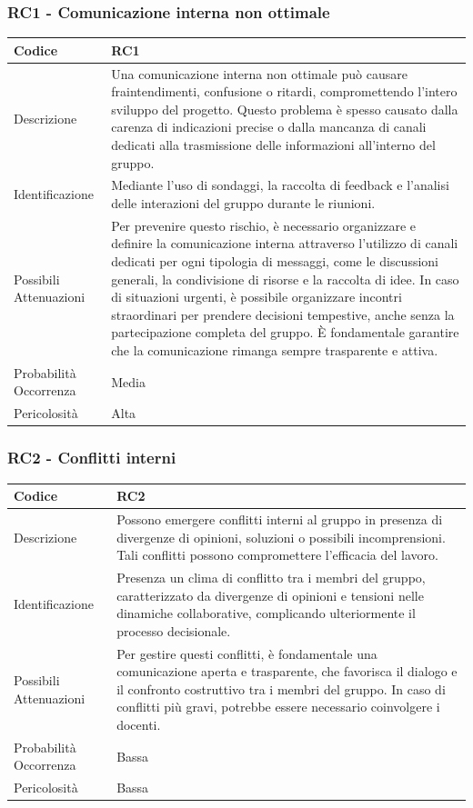 \documentclass[10pt]{article}
\begin{document}
{    \subsubsection{RC1 - Comunicazione interna non ottimale}
    \label{RC1}
    \begin{tabularx}{\textwidth}{|l|X|}
    \hline
    Codice & RC1 \\
    \hline
    Descrizione & Una comunicazione interna non ottimale può causare fraintendimenti, confusione o ritardi, compromettendo l’intero sviluppo del progetto. Questo problema è spesso causato dalla carenza di indicazioni precise o dalla mancanza di canali dedicati alla trasmissione delle informazioni all’interno del gruppo. \\
    \hline
    Identificazione & Mediante l'uso di sondaggi, la raccolta di feedback e l'analisi delle interazioni del gruppo durante le riunioni.   \\
    \hline
    Possibili Attenuazioni & Per prevenire questo rischio, è necessario organizzare e definire la comunicazione interna attraverso l’utilizzo di canali dedicati per ogni tipologia di messaggi, come le discussioni generali, la condivisione di risorse e la raccolta di idee. In caso di situazioni urgenti, è possibile organizzare incontri straordinari per prendere decisioni tempestive, anche senza la partecipazione completa del gruppo. È fondamentale garantire che la comunicazione rimanga sempre trasparente e attiva. \\
    \hline
    Probabilità Occorrenza &  Media \\
    \hline
    Pericolosità & Alta \\ 
    \hline
    \end{tabularx}
    
    \subsubsection{RC2 - Conflitti interni}
    \label{RC2}
    \begin{tabularx}{\textwidth}{|l|X|}
    \hline
    Codice & RC2 \\
    \hline
    Descrizione & Possono emergere conflitti interni al gruppo in presenza di divergenze di opinioni, soluzioni o possibili incomprensioni. Tali conflitti possono compromettere l'efficacia del lavoro. \\
    \hline
    Identificazione & Presenza un clima di conflitto tra i membri del gruppo, caratterizzato da divergenze di opinioni e tensioni nelle dinamiche collaborative, complicando ulteriormente il processo decisionale.   \\
    \hline
    Possibili Attenuazioni &  Per gestire questi conflitti, è fondamentale una comunicazione aperta e trasparente, che favorisca il dialogo e il confronto costruttivo tra i membri del gruppo. In caso di conflitti più gravi, potrebbe essere necessario coinvolgere i docenti. \\
    \hline
    Probabilità Occorrenza &  Bassa \\
    \hline
    Pericolosità & Bassa \\ 
    \hline
    \end{tabularx}
    

}
\end{document}
